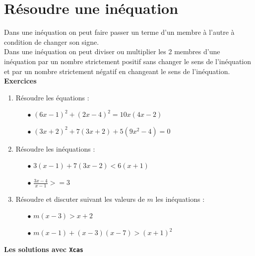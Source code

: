 \documentclass[a4paper,11pt]{book}
\begin{document}
\section{R\'esoudre une in\'equation}
Dans une in\'equation on peut faire passer un terme d'un membre \`a l'autre \`a
condition de changer son signe.\\
Dans une in\'equation on peut diviser ou multiplier les 2 membres d'une 
in\'equation par un nombre strictement positif sans changer le sens de 
l'in\'equation et par un nombre strictement n\'egatif en changeant le sens de 
l'in\'equation.\\
{\bf Exercices}
\begin{enumerate}
\item R\'esoudre les \'equations :
\begin{itemize}
\item[$\bullet$] $(6x-1)^2+(2x-4)^2=10x(4x-2)$
\item[$\bullet$] $(3x+2)^2+7(3x+2)+5(9x^2-4)=0$
\end{itemize}\item R\'esoudre les in\'equations :
\begin{itemize}
\item[$\bullet$] $3(x-1)+7(3x-2)<6(x+1)$
\item[$\bullet$] $\displaystyle \frac{3x-4}{x-1}>=3$
\end{itemize}
\item R\'esoudre et discuter suivant les valeurs de $m$ les in\'equations :
\begin{itemize}
\item[$\bullet$] $m(x-3)>x+2$
\item[$\bullet$] $m(x-1)+(x-3)(x-7)>(x+1)^2$
\end{itemize}
\end{enumerate}
{\bf Les solutions avec {\tt Xcas}}
\end{document}
